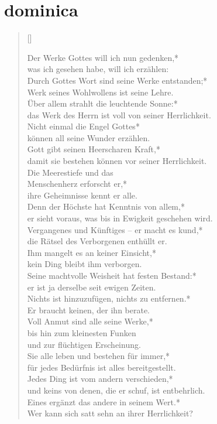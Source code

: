\section{dominica}

\begin{verse}[\versewidth]

Der Werke Gottes will ich nun gedenken,*\\
was ich gesehen habe, will ich erzählen:\\
\vin Durch Gottes Wort sind seine Werke entstanden;*\\
\vin Werk seines Wohlwollens ist seine Lehre.\\
Über allem strahlt die leuchtende Sonne:*\\
das Werk des Herrn ist voll von seiner Herrlichkeit.\\
\vin Nicht einmal die Engel Gottes*\\
\vin können all seine Wunder erzählen.\\ 
Gott gibt seinen Heerscharen Kraft,*\\
damit sie bestehen können vor seiner Herrlichkeit.\\
\vin Die Meerestiefe und das \\
\vin Menschenherz erforscht er,*\\
\vin ihre Geheimnisse kennt er alle.\\
Denn der Höchste hat Kenntnis von allem,*\\
er sieht voraus, was bis in Ewigkeit geschehen wird.\\
\vin Vergangenes und Künftiges – er macht es kund,*\\
\vin die Rätsel des Verborgenen enthüllt er.\\
Ihm mangelt es an keiner Einsicht,*\\
kein Ding bleibt ihm verborgen.\\
\vin Seine machtvolle Weisheit hat festen Bestand:*\\
\vin er ist ja derselbe seit ewigen Zeiten.\\
Nichts ist hinzuzufügen, nichts zu entfernen.*\\
Er braucht keinen, der ihn berate.\\
\vin Voll Anmut sind alle seine Werke,*\\
\vin bis hin zum kleinesten Funken\\
\vin und zur flüchtigen Erscheinung.\\
Sie alle leben und bestehen für immer,*\\
für jedes Bedürfnis ist alles bereitgestellt.\\
\vin Jedes Ding ist vom andern verschieden,*\\
\vin und keins von denen, die er schuf, ist entbehrlich.\\
Eines ergänzt das andere in seinem Wert.*\\
Wer kann sich satt sehn an ihrer Herrlichkeit?\\


\end{verse}
